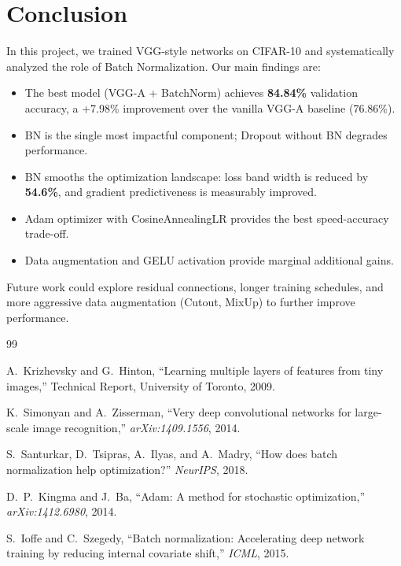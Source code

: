 \documentclass[11pt,a4paper]{article}
\begin{document}
\section{Conclusion}

In this project, we trained VGG-style networks on CIFAR-10 and systematically analyzed
the role of Batch Normalization. Our main findings are:

\begin{itemize}
    \item The best model (VGG-A + BatchNorm) achieves \textbf{84.84\%} validation accuracy,
          a +7.98\% improvement over the vanilla VGG-A baseline (76.86\%).
    \item BN is the single most impactful component; Dropout without BN degrades performance.
    \item BN smooths the optimization landscape: loss band width is reduced by \textbf{54.6\%},
          and gradient predictiveness is measurably improved.
    \item Adam optimizer with CosineAnnealingLR provides the best speed-accuracy trade-off.
    \item Data augmentation and GELU activation provide marginal additional gains.
\end{itemize}

Future work could explore residual connections, longer training schedules, and
more aggressive data augmentation (Cutout, MixUp) to further improve performance.


\begin{thebibliography}{99}

A.~Krizhevsky and G.~Hinton,
``Learning multiple layers of features from tiny images,''
Technical Report, University of Toronto, 2009.

K.~Simonyan and A.~Zisserman,
``Very deep convolutional networks for large-scale image recognition,''
\textit{arXiv:1409.1556}, 2014.

S.~Santurkar, D.~Tsipras, A.~Ilyas, and A.~Madry,
``How does batch normalization help optimization?''
\textit{NeurIPS}, 2018.

D.~P.~Kingma and J.~Ba,
``Adam: A method for stochastic optimization,''
\textit{arXiv:1412.6980}, 2014.

S.~Ioffe and C.~Szegedy,
``Batch normalization: Accelerating deep network training by reducing internal covariate shift,''
\textit{ICML}, 2015.

\end{thebibliography}
\end{document}
